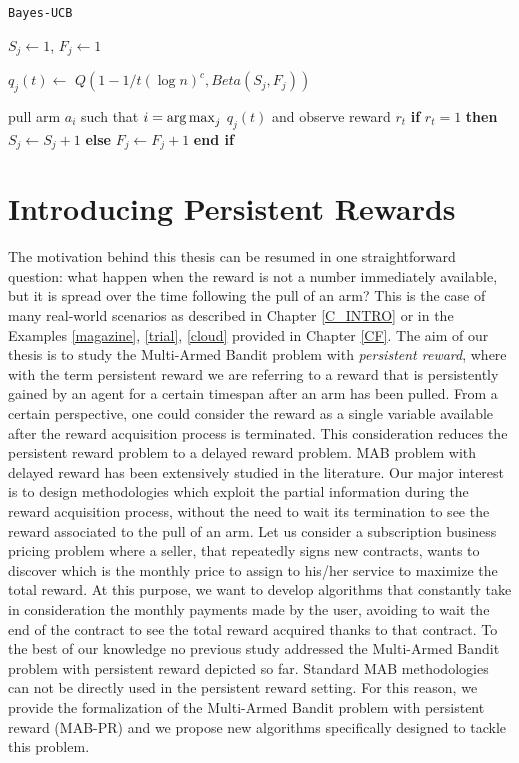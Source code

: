 \begin{algorithm}[H]
	\caption{\texttt{Bayes-UCB}}
	\begin{scriptsize}
		\begin{algorithmic}[1]						
			 
			\State $S_j \gets 1 $, $F_j \gets 1 $
			\EndFor
			 
			
			\State  $q_j(t) \gets$  $Q(1-{1}/{t(\log n)^c},Beta(S_j,F_j))$
			
			\EndFor
			\State pull arm $a_i$ such that  $i = \operatorname*{arg\,max}_j$ $q_j(t) $ and observe reward ${r_t}$	
			\State 	\textbf{if} $r_t=1$  \textbf{then} $S_j \gets S_j + 1$ \textbf{else}  $F_j \gets F_j + 1$  \textbf{end if}
			
			
			\EndFor	
		\end{algorithmic}
	\end{scriptsize}
	\label{a:BU}
\end{algorithm}


\section{Introducing Persistent Rewards}

The motivation behind this thesis can be resumed in one straightforward question: what happen when the reward is not a number immediately available, but it is spread over the time following the pull of an arm? This is the case of many real-world scenarios as described in Chapter \ref{C_INTRO} or in the Examples \ref{magazine}, \ref{trial}, \ref{cloud} provided in Chapter \ref{CF}. The aim of our thesis is to study the  Multi-Armed Bandit problem with \emph{persistent reward}, where with the term persistent reward we are referring to a reward that is persistently gained by an agent for a certain timespan after an arm has been pulled. From a certain perspective, one could consider the reward as a single variable available after the reward acquisition process is terminated. This consideration reduces the persistent reward problem to a delayed reward problem. MAB problem with delayed reward has been extensively studied in the literature. Our major interest is to design methodologies which exploit the partial information during the reward acquisition process, without the need to wait its termination to see the reward associated to the pull of an arm. Let us consider a subscription business pricing problem where a seller, that repeatedly signs new contracts, wants to discover which is the monthly price to assign to his/her service to maximize the total reward. At this purpose, we want to develop algorithms that constantly take in consideration the monthly payments made by the user, avoiding to wait the end of the contract to see the total reward acquired thanks to that contract. To the best of our knowledge no previous study addressed the Multi-Armed Bandit problem with persistent reward depicted so far. Standard MAB methodologies can not be directly used in the persistent reward setting. For this reason, we provide the formalization of the Multi-Armed Bandit problem with persistent reward (MAB-PR) and we propose new algorithms specifically designed to tackle this problem.

